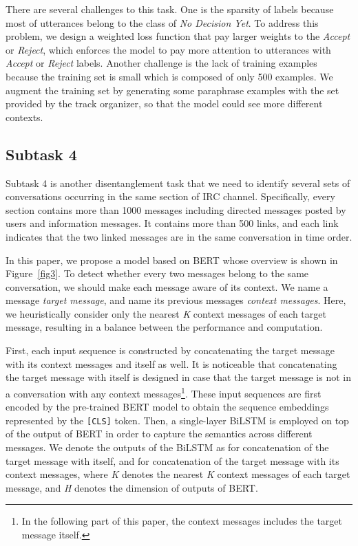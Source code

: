 \documentclass[letterpaper]{article} \usepackage{aaai20}  \usepackage{times}  \usepackage{helvet} \usepackage{courier}  \usepackage[hyphens]{url}  \usepackage{graphicx} \urlstyle{rm} \def\UrlFont{\rm}  \usepackage{graphicx}  \frenchspacing  \setlength{\pdfpagewidth}{8.5in}  \setlength{\pdfpageheight}{11in}
\begin{document}
    There are several challenges to this task.
    One is the sparsity of labels because most of utterances belong to the class of \emph{No Decision Yet}.
    To address this problem, we design a weighted loss function that pay larger weights to the \emph{Accept} or \emph{Reject}, which enforces the model to pay more attention to utterances with \emph{Accept} or \emph{Reject} labels.
    Another challenge is the lack of training examples because the training set is small which is composed of only 500 examples.
    We augment the training set by generating some paraphrase examples with the set provided by the track organizer, so that the model could see more different contexts.


  \subsection{Subtask 4}

    Subtask 4 is another disentanglement task that we need to identify several sets of conversations occurring in the same section of IRC channel.
    Specifically, every section contains more than 1000 messages including directed messages posted by users and information messages.
    It contains more than 500 links, and each link indicates that the two linked messages are in the same conversation in time order.

    In this paper, we propose a model based on BERT whose overview is shown in Figure~\ref{fig3}.
    To detect whether every two messages belong to the same conversation, we should make each message aware of its context.
    We name a message \emph{target message}, and name its previous messages \emph{context messages}.
    Here, we heuristically consider only the nearest \emph{K} context messages of each target message, resulting in a balance between the performance and computation.

    First, each input sequence is constructed by concatenating the target message with its context messages and itself as well.
    It is noticeable that concatenating the target message with itself is designed in case that the target message is not in a conversation with any context messages\footnote{In the following part of this paper, the context messages includes the target message itself.}.
    These input sequences are first encoded by the pre-trained BERT model to obtain the sequence embeddings represented by the \texttt{[CLS]} token.
    Then, a single-layer BiLSTM is employed on top of the output of BERT in order to capture the semantics across different messages.
We denote the outputs of the BiLSTM as  for concatenation of the target message with itself, and  for concatenation of the target message with its context messages, where \emph{K} denotes the nearest \emph{K} context messages of each target message, and \emph{H} denotes the dimension of outputs of BERT.
\end{document}
